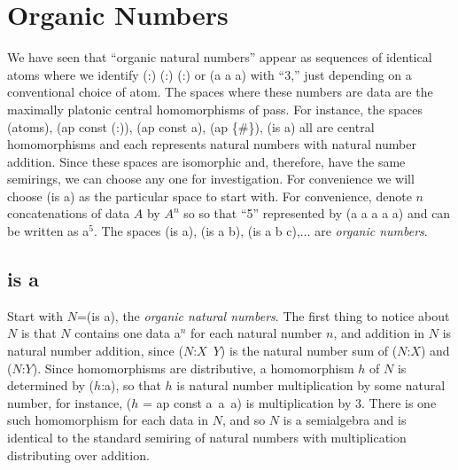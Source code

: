 \documentclass[11pt]{article}
\begin{document}
\section{Organic Numbers}

      We have seen that ``organic natural numbers'' appear as sequences of identical atoms where we identify (:) (:) (:) or (a a a) with ``3,'' just depending 
 on a conventional choice of atom.  The spaces where these numbers are data are the maximally platonic central homomorphisms of 
 pass.  For instance, the spaces (atoms), (ap const (:)), (ap const a), (ap \{\#\}), (is a) all are central homomorphisms and each represents natural numbers 
 with natural number addition.  Since these spaces are isomorphic and, therefore, have the same semirings, we can choose any one for investigation.  
 For convenience we will choose (is a) as the particular space to start with.  For convenience, denote $n$ concatenations of data $A$ by $A^n$ so so that 
 ``5'' represented by (a a a a a) and can be written as a$^5$.  
 The spaces (is a), (is a b), (is a b c),$\dots$ are {\it organic numbers}.  
      
\subsection{is a}     
     
     Start with $N$=(is a), the {\it organic natural numbers}.  
The first thing to notice about $N$ is that $N$ contains one data a$^n$ for each 
natural number $n$, and addition in $N$ is natural number addition, 
since ($N$:$X$\ $Y$) is the natural number sum of ($N$:$X$) and ($N$:$Y$).  Since homomorphisms are distributive, a homomorphism $h$ of $N$ is determined by ($h$:a), so that $h$ is natural number multiplication by some natural number, 
for instance, ($h$ = ap const a\ a\ a) is multiplication by $3$.  There is one such homomorphism for each data in $N$, and so $N$ is a semialgebra and 
is identical to the standard semiring of natural numbers with multiplication distributing over addition.
     
\end{document}
